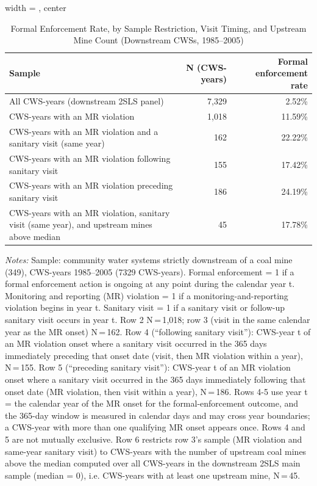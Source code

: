 \begin{table}[htbp]
\caption{\label{tab:sanitary_visit_timing_formal_enforcement_rate} Formal Enforcement Rate, by Sample Restriction, Visit Timing, and Upstream Mine Count (Downstream CWSs, 1985--2005)}
\bigskip
\centering
\begin{adjustbox}{width = \textwidth, center}
\begin{tabular}{lrr}
\toprule
Sample & N (CWS-years) & Formal enforcement rate \\
\midrule
All CWS-years (downstream 2SLS panel) & 7{,}329 & 2.52\% \\
CWS-years with an MR violation & 1{,}018 & 11.59\% \\
CWS-years with an MR violation and a sanitary visit (same year) & 162 & 22.22\% \\
CWS-years with an MR violation following sanitary visit & 155 & 17.42\% \\
CWS-years with an MR violation preceding sanitary visit & 186 & 24.19\% \\
CWS-years with an MR violation, sanitary visit (same year), and upstream mines above median & 45 & 17.78\% \\
\bottomrule
\end{tabular}
\end{adjustbox}
{\tiny\linespread{1}\selectfont \par \raggedright 
\textit{Notes:} Sample: community water systems strictly downstream of a coal mine (349), CWS-years 1985--2005 (7329 CWS-years). Formal enforcement = 1 if a formal enforcement action is ongoing at any point during the calendar year t. Monitoring and reporting (MR) violation = 1 if a monitoring-and-reporting violation begins in year t. Sanitary visit = 1 if a sanitary visit or follow-up sanitary visit occurs in year t. Row 2 N\,=\,1{,}018; row 3 (visit in the same calendar year as the MR onset) N\,=\,162. Row 4 (``following sanitary visit''): CWS-year t of an MR violation onset where a sanitary visit occurred in the 365 days immediately preceding that onset date (visit, then MR violation within a year), N\,=\,155. Row 5 (``preceding sanitary visit''): CWS-year t of an MR violation onset where a sanitary visit occurred in the 365 days immediately following that onset date (MR violation, then visit within a year), N\,=\,186. Rows 4-5 use year t = the calendar year of the MR onset for the formal-enforcement outcome, and the 365-day window is measured in calendar days and may cross year boundaries; a CWS-year with more than one qualifying MR onset appears once. Rows 4 and 5 are not mutually exclusive. Row 6 restricts row 3's sample (MR violation and same-year sanitary visit) to CWS-years with the number of upstream coal mines above the median computed over all CWS-years in the downstream 2SLS main sample (median = 0), i.e. CWS-years with at least one upstream mine, N\,=\,45.
}
\end{table}
